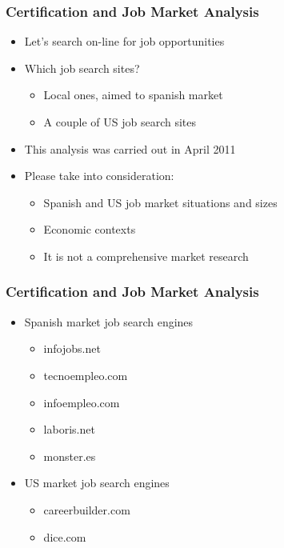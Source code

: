 \documentclass{beamer}
\begin{document}
\begin{frame}
\frametitle{Certification and Job Market Analysis}
\begin{itemize}
\item Let's search on-line for job opportunities

\item Which job search sites? 
  \begin{itemize}
  \item Local ones, aimed to spanish market
  \item A couple of US job search sites
  \end{itemize}

\item This analysis was carried out in April 2011

\item Please take into consideration: 
  \begin{itemize}
  \item Spanish and US job market situations and sizes
  \item Economic contexts
  \item It is not a comprehensive market research
  \end{itemize}

\end{itemize}
\end{frame}



\begin{frame}
\frametitle{Certification and Job Market Analysis}
\begin{itemize}

\item Spanish market job search engines
  \begin{itemize}
  \item infojobs.net
  \item tecnoempleo.com	
  \item infoempleo.com	
  \item laboris.net
  \item monster.es
  \end{itemize}

\item US market job search engines
  \begin{itemize}
  \item careerbuilder.com
  \item dice.com
  \end{itemize}

\end{itemize}

\end{frame}
\end{document}
